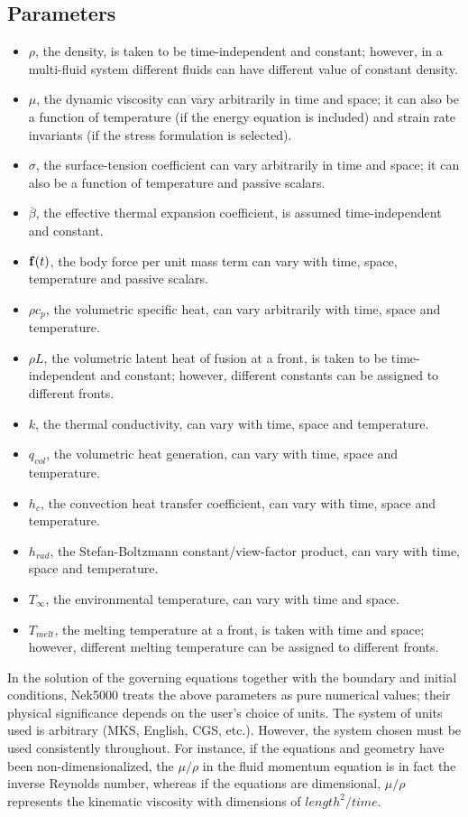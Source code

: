     
\subsection{Parameters}
\begin{itemize}  
\item $\rho$, the density, is taken to be time-independent and
  constant; however, in a multi-fluid system
  different fluids can have different value of constant density.
\item $\mu$, the dynamic viscosity can vary arbitrarily in
  time and space; it can also be a function of temperature
  (if the energy equation is included) and strain rate
  invariants (if the stress formulation is selected).
\item $\sigma$, the surface-tension coefficient can vary
  arbitrarily in
  time and space; it can also be a function of temperature
  and passive scalars.
\item $\overline{\beta}$, the effective thermal expansion
  coefficient, is
  assumed time-independent and constant.
\item ${\bf f}(t)$, the body force per unit mass term can
  vary with time, space, temperature and passive scalars.
\item $\rho c_{p}$, the volumetric specific heat, can vary
  arbitrarily with time, space and temperature.
\item $\rho L$, the volumetric latent heat of fusion at a front,
  is taken to be time-independent and constant; however,
  different constants can be assigned to different fronts.
\item $k$, the thermal conductivity, can vary with time,
  space and temperature.
\item $q_{vol}$, the volumetric heat generation, can vary with
  time, space and temperature.
\item $h_{c}$, the convection heat transfer coefficient, can vary
  with time, space and temperature.
\item $h_{rad}$, the Stefan-Boltzmann constant/view-factor product,
  can vary with time, space and temperature.
\item $T_{\infty}$, the environmental temperature, can vary
  with time and space.
\item $T_{melt}$, the melting temperature at a front, is taken
  with time and space; however, different melting temperature
  can be assigned to different fronts.
\end{itemize}
  
In the solution of the governing equations together with
the boundary and initial conditions, Nek5000 treats the
above parameters as pure numerical values; their
physical significance depends on the user's choice of units.
The system of units used is arbitrary (MKS, English, CGS,
etc.). However, the system chosen must be used consistently
throughout. For instance, if the equations and geometry
have been non-dimensionalized, the $\mu / \rho$ in the fluid
momentum equation is in fact
the inverse Reynolds number, whereas if the equations are
dimensional, $\mu / \rho$ represents the kinematic viscosity with
dimensions of $length^{2}/time$.